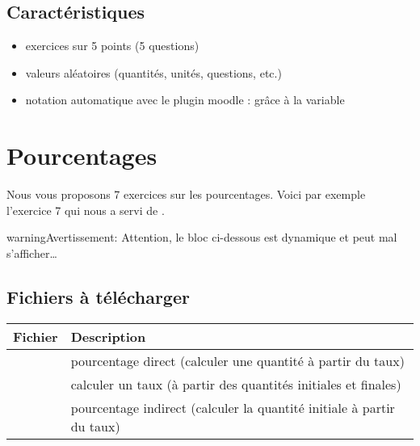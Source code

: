 \documentclass[letterpaper,10pt,french]{sphinxmanual}
\begin{document}
\subsection{Caractéristiques}
\label{\detokenize{analyse alg_xe8bre - proportionnalit_xe9:caracteristiques}}\begin{itemize}
\item {} 
exercices sur 5 points (5 questions)

\item {} 
valeurs aléatoires (quantités, unités, questions, etc.)

\item {} 
notation automatique avec le plugin moodle : grâce à la variable 

\end{itemize}


\section{Pourcentages}
\label{\detokenize{analyse alg_xe8bre - pourcentages:pourcentages}}\label{\detokenize{analyse alg_xe8bre - pourcentages::doc}}
Nous vous proposons 7 exercices sur les pourcentages.
Voici par exemple l’exercice 7 qui nous a servi de .

\begin{sphinxadmonition}{warning}{Avertissement:}
Attention, le bloc ci-dessous est dynamique et peut mal s’afficher…
\end{sphinxadmonition}




\subsection{Fichiers à télécharger}
\label{\detokenize{analyse alg_xe8bre - pourcentages:fichiers-a-telecharger}}

\begin{savenotes}\sphinxattablestart
\centering
{}
\label{\detokenize{analyse alg_xe8bre - pourcentages:id1}}
\sphinxaftercaption
\begin{tabulary}{\linewidth}[t]{|T|T|}
\hline
\sphinxstyletheadfamily 
Fichier
&\sphinxstyletheadfamily 
Description
\\
\hline
{}
&
pourcentage direct (calculer une quantité à partir du taux)
\\
\hline
{}
&
calculer un taux (à partir des quantités initiales et finales)
\\
\hline
{}
&
pourcentage indirect (calculer la quantité initiale à partir du taux)
\\
\hline
\end{tabulary}
\par
\sphinxattableend\end{savenotes}
\end{document}
